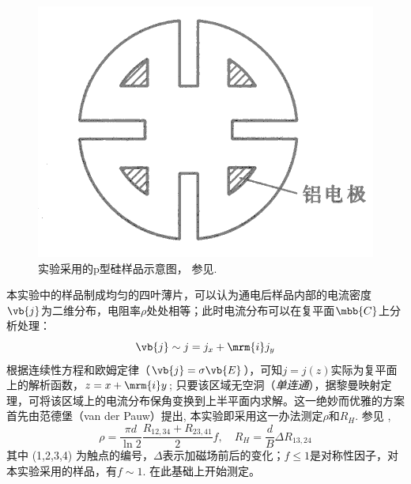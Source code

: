 \documentclass[aps,pre,12pt,preprint,%
	onecolumn,showpacs,showkeys,nofootinbib]{revtex4-1}
\begin{document}
	\begin{figure}[!h]
	\vspace{-2ex}
	\includegraphics[width=.35\linewidth]{specSi.png}
	\caption[实验样品示意]{实验采用的p型硅样品示意图，
		参见\cite{textbook}.}
	\label{fig:specSi}
	\vspace{-1ex}
	\end{figure}
	本实验中的样品制成均匀的四叶薄片，可以认为通电后样品内部的电流密度$\vb{j}$为二维分布，电阻率$\rho$处处相等；此时电流分布可以在复平面$\mbb{C}$上分析处理：
	\[ \vb{j}\sim j = j_x + \mrm{i} j_y \]
	根据连续性方程和欧姆定律（$\vb{j} = \sigma\vb{E}$），可知$j = j(z)$实际为复平面上的解析函数，$z = x + \mrm{i}y$; 只要该区域无空洞（\textit{单连通}），据黎曼映射定理，可将该区域上的电流分布保角变换到上半平面内求解。这一绝妙而优雅的方案首先由范德堡（van der Pauw）提出\supercite{van1958method}, 本实验即采用这一办法测定$\rho$和$R_H$. 参见 \cite{van1958method}, 
	\begin{equation}
		\rho = \frac{\pi d}{\ln 2}
			\frac{R_{12,34} + R_{23,41}}{2} f,\quad
		R_H = \frac{d}{B} \Delta R_{13,24}
	\end{equation}
	其中 (1,2,3,4) 为触点的编号，$\Delta$表示加磁场前后的变化；$f \le 1$是对称性因子，对本实验采用的样品，有$f\sim 1$. 在此基础上开始测定。
\end{document}
